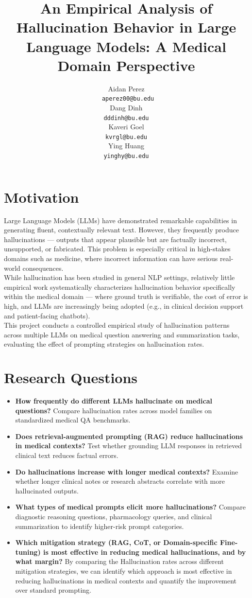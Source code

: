 \documentclass[11pt]{article}
\title{An Empirical Analysis of Hallucination Behavior in Large Language Models: A Medical Domain Perspective}
\author{
  Aidan Perez \\
  \texttt{ aperez00@bu.edu} \\\And
  Dang Dinh \\
  \texttt{dddinh@bu.edu} \\\And
  Kaveri Goel\\
  \texttt{kvrgl@bu.edu} \\\And
  Ying Huang \\
  \texttt{yinghy@bu.edu} }
\begin{document}
\maketitle

\section{Motivation}

Large Language Models (LLMs) have demonstrated remarkable capabilities in generating fluent, contextually relevant text. However, they frequently produce hallucinations — outputs that appear plausible but are factually incorrect, unsupported, or fabricated. This problem is especially critical in high-stakes domains such as medicine, where incorrect information can have serious real-world consequences.
\\
While hallucination has been studied in general NLP settings, relatively little empirical work systematically characterizes hallucination behavior specifically within the medical domain — where ground truth is verifiable, the cost of error is high, and LLMs are increasingly being adopted (e.g., in clinical decision support and patient-facing chatbots).
\\
This project conducts a controlled empirical study of hallucination patterns across multiple LLMs on medical question answering and summarization tasks, evaluating the effect of prompting strategies on hallucination rates.

\section{Research Questions}
\begin{itemize}
    \item \textbf{How frequently do different LLMs hallucinate on medical questions?} Compare hallucination rates across model families on standardized medical QA benchmarks.
    \item \textbf{Does retrieval-augmented prompting (RAG) reduce hallucinations in medical contexts?} Test whether grounding LLM responses in retrieved clinical text reduces factual errors.
    \item \textbf{Do hallucinations increase with longer medical contexts? } Examine whether longer clinical notes or research abstracts correlate with more hallucinated outputs.
    \item \textbf{What types of medical prompts elicit more hallucinations?} Compare diagnostic reasoning questions, pharmacology queries, and clinical summarization to identify higher-risk prompt categories.
    \item \textbf{Which mitigation strategy (RAG, CoT, or Domain-specific Fine-tuning) is most effective in reducing medical hallucinations, and by what margin?} By comparing the Hallucination rates across different mitigation strategies, we can identify which approach is most effective in reducing hallucinations in medical contexts and quantify the improvement over standard prompting.
\end{itemize}
\end{document}
